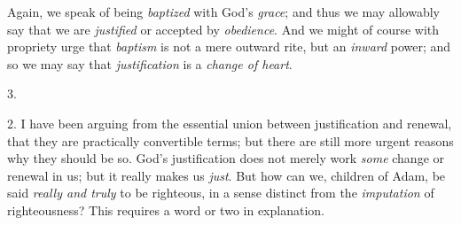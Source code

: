 Again, we speak of being \emph{baptized} with God's \emph{grace};
and thus we may allowably say that we are \emph{justified} or accepted
by \emph{obedience}. And we might of course with propriety urge that \emph{baptism}
is not a mere outward rite, but an \emph{inward} power; and so we may
say that \emph{justification} is a \emph{change of heart}.

3.

2. I have been arguing from the essential union between
justification and renewal, that they are practically convertible
terms; but there are still more urgent reasons why they should be so.
God's justification does not merely work \emph{some} change or renewal
in us; but it really makes us \emph{just}. But how can we, children of
Adam, be said \emph{really and truly} to be righteous, in a sense
distinct from the \emph{imputation} of righteousness? This requires a
word or two in explanation.

